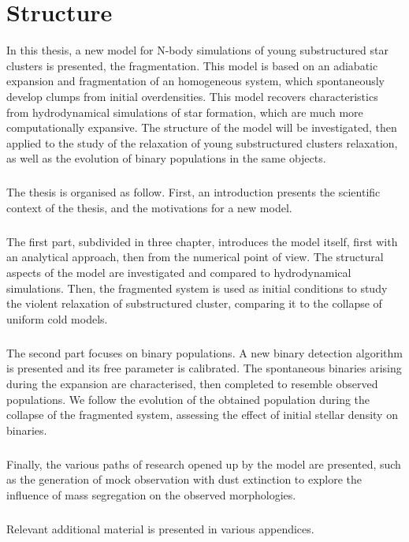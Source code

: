 
\chapter*{Structure}

In this thesis, a new model for N-body simulations of young substructured star clusters is presented, the \HubLem fragmentation. This model is based on an adiabatic expansion and fragmentation of an homogeneous system, which spontaneously develop clumps from initial overdensities. This model recovers characteristics from hydrodynamical simulations of star formation, which are much more computationally expansive. The structure of the \HubLem model will be investigated, then applied to the study of the relaxation of young substructured clusters relaxation, as well as the evolution of binary populations in the same objects. 

\paragraph*{}
The thesis is organised as follow. First, an introduction presents the scientific context of the thesis, and the motivations for a new model. 

\paragraph*{}
The first part, subdivided in three chapter, introduces the \HubLem model itself, first with an analytical approach, then from the numerical point of view. The structural aspects of the model are investigated and compared to hydrodynamical simulations. Then, the fragmented system is used as initial conditions to study the violent relaxation of substructured cluster, comparing it to the collapse of uniform cold models.

\paragraph*{}
The second part focuses on binary populations. A new binary detection algorithm is presented and its free parameter is calibrated. The spontaneous binaries arising during the \HubLem expansion are characterised, then completed to resemble observed populations. We follow the evolution of the obtained population during the collapse of the fragmented system, assessing the effect of initial stellar density on binaries.

\paragraph*{}
Finally,  the various paths of research opened up by the \HubLem model are presented, such as the generation of mock observation with dust extinction to explore the influence of mass segregation on the observed morphologies.%

\paragraph*{}
Relevant additional material is presented in various appendices. 